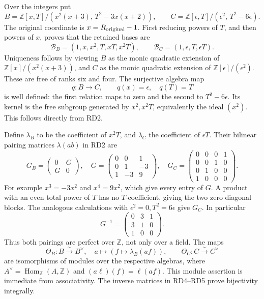 \documentclass[
  10pt,
  a4paper,
]{article}
\begin{document}
Over the integers put \[
B=\mathbb Z[x,T]/(x^2(x+3),\,T^2-3x(x+2)),\qquad
C=\mathbb Z[\epsilon,T]/(\epsilon^2,\,T^2-6\epsilon).
\tag{RD1}
\] The original coordinate is \(x=R_{\rm original}-1\). First reducing
powers of \(T\), and then powers of \(x\), proves that the retained
bases are \[
\mathcal B_B=(1,x,x^2,T,xT,x^2T),\qquad
\mathcal B_C=(1,\epsilon,T,\epsilon T).
\tag{RD2}
\] Uniqueness follows by viewing \(B\) as the monic quadratic extension
of \(\mathbb Z[x]/(x^2(x+3))\), and \(C\) as the monic quadratic
extension of \(\mathbb Z[\epsilon]/(\epsilon^2)\). These are free of
ranks six and four. The surjective algebra map \[
q:B\longrightarrow C,\qquad q(x)=\epsilon,\quad q(T)=T
\tag{RD3}
\] is well defined: the first relation maps to zero and the second to
\(T^2-6\epsilon\). Its kernel is the free subgroup generated by
\(x^2,x^2T\), equivalently the ideal \((x^2)\). This follows directly
from RD2.

Define \(\lambda_B\) to be the coefficient of \(x^2T\), and
\(\lambda_C\) the coefficient of \(\epsilon T\). Their bilinear pairing
matrices \(\lambda(ab)\) in RD2 are \[
G_B=\begin{pmatrix}0&G\\G&0\end{pmatrix},
\quad
G=\begin{pmatrix}0&0&1\\0&1&-3\\1&-3&9\end{pmatrix},
\quad
G_C=\begin{pmatrix}0&0&0&1\\0&0&1&0\\0&1&0&0\\1&0&0&0\end{pmatrix}.
\tag{RD4}
\] For example \(x^3=-3x^2\) and \(x^4=9x^2\), which give every entry of
\(G\). A product with an even total power of \(T\) has no
\(T\)-coefficient, giving the two zero diagonal blocks. The analogous
calculations with \(\epsilon^2=0,T^2=6\epsilon\) give \(G_C\). In
particular \[
G^{-1}=\begin{pmatrix}0&3&1\\3&1&0\\1&0&0\end{pmatrix}.
\tag{RD5}
\] Thus both pairings are perfect over \(\mathbb Z\), not only over a
field. The maps \[
\Theta_B:B\xrightarrow{\sim}B^\vee,\quad
a\mapsto(f\mapsto\lambda_B(af)),\qquad
\Theta_C:C\xrightarrow{\sim}C^\vee
\tag{RD6}
\] are isomorphisms of modules over the respective algebras, where
\(A^\vee=\operatorname{Hom}_{\mathbb Z}(A,\mathbb Z)\) and
\((a\ell)(f)=\ell(af)\). This module assertion is immediate from
associativity. The inverse matrices in RD4--RD5 prove bijectivity
integrally.
\end{document}
